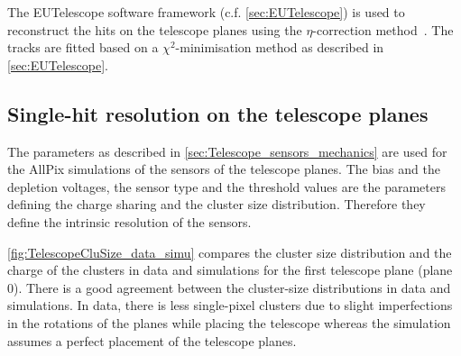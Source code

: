 The EUTelescope software framework (c.f. \cref{sec:EUTelescope}) is
used to reconstruct the hits on the telescope planes using the
$\eta$-correction method~\cite{Belau:1983eh}. The tracks are fitted
based on a $\chi^2$-minimisation method as described in
\cref{sec:EUTelescope}.

\subsection{Single-hit resolution on the telescope planes}

The parameters as described in \cref{sec:Telescope_sensors_mechanics}
are used for the AllPix simulations of the sensors of the telescope
planes. The bias and the depletion voltages, the sensor type and the
threshold values are the parameters defining the charge sharing and
the cluster size distribution. Therefore they define the intrinsic
resolution of the sensors.



\cref{fig:TelescopeCluSize_data_simu} compares the cluster size
distribution and the charge of the clusters in data and simulations
for the first telescope plane (plane 0). There is a good agreement
between the cluster-size distributions in data and simulations. In
data, there is less single-pixel clusters due to slight imperfections
in the rotations of the planes while placing the telescope whereas the
simulation assumes a perfect placement of the telescope planes.

